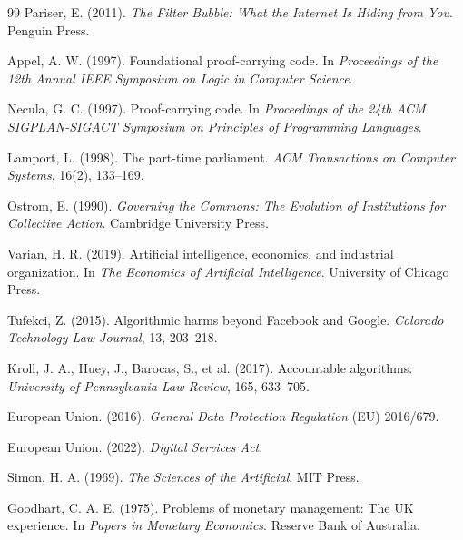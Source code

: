 \documentclass[11pt,oneside]{article}
\begin{document}
\begin{thebibliography}{99}
Pariser, E. (2011).
\textit{The Filter Bubble: What the Internet Is Hiding from You}.
Penguin Press.

Appel, A. W. (1997).
Foundational proof-carrying code.
In \textit{Proceedings of the 12th Annual IEEE Symposium on Logic in Computer Science}.

Necula, G. C. (1997).
Proof-carrying code.
In \textit{Proceedings of the 24th ACM SIGPLAN-SIGACT Symposium on Principles of Programming Languages}.

Lamport, L. (1998).
The part-time parliament.
\textit{ACM Transactions on Computer Systems}, 16(2), 133–169.

Ostrom, E. (1990).
\textit{Governing the Commons: The Evolution of Institutions for Collective Action}.
Cambridge University Press.

Varian, H. R. (2019).
Artificial intelligence, economics, and industrial organization.
In \textit{The Economics of Artificial Intelligence}.
University of Chicago Press.

Tufekci, Z. (2015).
Algorithmic harms beyond Facebook and Google.
\textit{Colorado Technology Law Journal}, 13, 203–218.

Kroll, J. A., Huey, J., Barocas, S., et al. (2017).
Accountable algorithms.
\textit{University of Pennsylvania Law Review}, 165, 633–705.

European Union. (2016).
\textit{General Data Protection Regulation} (EU) 2016/679.

European Union. (2022).
\textit{Digital Services Act}.

Simon, H. A. (1969).
\textit{The Sciences of the Artificial}.
MIT Press.

Goodhart, C. A. E. (1975).
Problems of monetary management: The UK experience.
In \textit{Papers in Monetary Economics}.
Reserve Bank of Australia.

\end{thebibliography}
\end{document}
